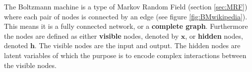 \documentclass[twoside,english]{uiofysmaster}
\begin{document}




The Boltzmann machine \cite{Ackley1985} is a type of Markov Random Field (section \ref{sec:MRF}) where each pair of nodes is connected by an edge (see figure \ref{fig:BMwikipedia}). This means it is a fully connected network, or a \textbf{complete graph}. Furthermore the nodes are defined as either \textbf{visible} nodes, denoted by $\bm{x}$, or \textbf{hidden} nodes, denoted $\bm{h}$. The visible nodes are the input and output. The hidden nodes are latent variables of which the purpose is to encode complex interactions between the visible nodes. 
\end{document}
